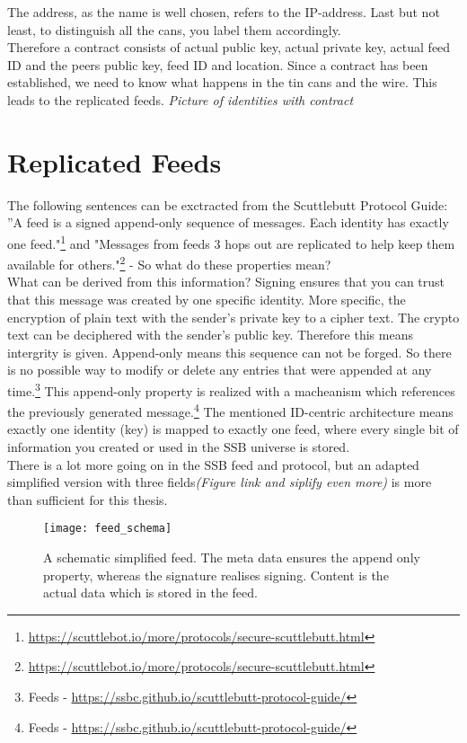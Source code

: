 The address, as the name is well chosen, refers to the IP-address. Last but not least, to distinguish all the cans, you label them accordingly. \\

Therefore a contract consists of actual public key, actual private key, actual feed ID and the peers public key, feed ID and location. Since a contract has been established, we need to know what happens in the tin cans and the wire. This leads to the replicated feeds.
\textit{Picture of identities with contract}

\section{Replicated Feeds}
The following sentences can be exctracted from the Scuttlebutt Protocol Guide: ”A feed is a signed append-only sequence of messages. Each identity has exactly one feed."\footnote{\url{https://scuttlebot.io/more/protocols/secure-scuttlebutt.html}} and "Messages from feeds 3 hops out are replicated to help keep them available for others."\footnote{\url{https://scuttlebot.io/more/protocols/secure-scuttlebutt.html}} - So what do these properties mean?\\

What can be derived from this information? Signing ensures that you can trust that this message was created by one specific identity. More specific, the encryption of plain text with the sender’s private key to a cipher text. The crypto text can be deciphered with the sender’s public key. Therefore this means intergrity is given. Append-only means this sequence can not be forged. So there is no possible way to modify or delete any entries that were appended at any time.\footnote{Feeds - \url{https://ssbc.github.io/scuttlebutt-protocol-guide/}} This append-only property is realized with a macheanism which references the previously generated message.\footnote{Feeds - \url{https://ssbc.github.io/scuttlebutt-protocol-guide/}} The mentioned ID-centric architecture means exactly one identity (key) is mapped to exactly one feed, where every single bit of information you created or used in the SSB universe is stored.
\\
There is a lot more going on in the SSB feed and protocol, but an adapted simplified version with three fields\textit{(Figure link and siplify even more)} is more than sufficient for this thesis. 

\begin{figure}
    \centering
    \texttt{[image: feed\_schema]}
    \caption{A schematic simplified feed. The meta data ensures the append only property, whereas the signature realises signing. Content is the actual data which is stored in the feed.}
    \label{fig:feed_schema}
\end{figure}



